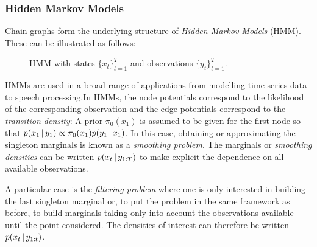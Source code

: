 \subsubsection{Hidden Markov Models}
Chain graphs form the underlying structure of \emph{Hidden Markov Models} (HMM). These can be illustrated as follows:
\begin{figure}[!h]
\center
{}
\caption{\label{fig: hmm1} HMM with states $\{x_{t}\}_{t=1}^{T}$ and observations $\{y_{t}\}_{t=1}^{T}$.}
\end{figure}

HMMs are used in a broad range of applications from modelling time series data to speech processing.\addref In HMMs, the node potentials correspond to the likelihood of the corresponding observation and the edge potentials correspond to the \emph{transition density}:\addref
{}
A prior $\pi_{0}(x_{1})$ is assumed to be given for the first node so that $p(x_1\,|\, y_{1}) \propto \pi_{0}(x_1)p(y_1\,|\, x_1)$. In this case, obtaining or approximating the singleton marginals is known as a \emph{smoothing problem}. The marginals or \emph{smoothing densities} can be written $p(x_t\,|\, y_{1:T})$ to make explicit the dependence on all available observations.

A particular case is the \emph{filtering problem} where one is only interested in building the last singleton marginal or, to put the problem in the same framework as before, to build marginals taking only into account the observations available until the point considered. The densities of interest can therefore be written $p(x_t\,|\, y_{1:t})$.

